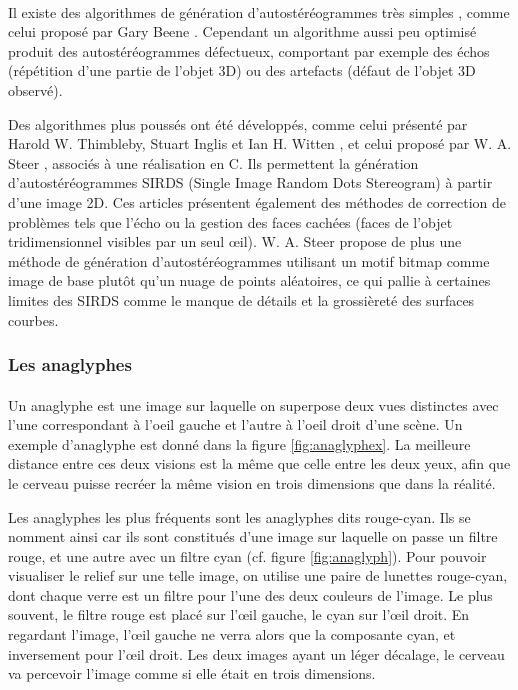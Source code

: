 \paragraph{}
Il existe des algorithmes de génération d’autostéréogrammes très simples , comme celui proposé par Gary Beene \cite{garybeene}. Cependant un algorithme aussi peu optimisé produit des autostéréogrammes défectueux, comportant par exemple des échos (répétition d'une partie de l'objet 3D) ou des artefacts (défaut de l'objet 3D observé).

Des algorithmes plus poussés ont été développés, comme celui présenté par Harold W. Thimbleby, Stuart Inglis et Ian H. Witten \cite{stereogram}, et celui proposé par W. A. Steer \cite{wasteer}, associés à une réalisation en C. Ils permettent la génération d’autostéréogrammes SIRDS (Single Image Random Dots Stereogram) à partir d’une image 2D. Ces articles présentent également des méthodes de correction de problèmes tels que l'écho ou la gestion des faces cachées (faces de l'objet tridimensionnel visibles par un seul œil). W. A. Steer propose de plus une méthode de génération d'autostéréogrammes utilisant un motif bitmap comme image de base plutôt qu'un nuage de points aléatoires, ce qui pallie à certaines limites des SIRDS comme le manque de détails et la grossièreté des surfaces courbes.

\subsubsection{Les anaglyphes}

\paragraph{}
	Un anaglyphe est une image sur laquelle on superpose deux vues distinctes avec l'une correspondant à l'oeil gauche et l'autre à l'oeil droit d’une scène. Un exemple d'anaglyphe est donné dans la figure \ref{fig:anaglyphex}. La meilleure distance entre ces deux visions est la même que celle entre les deux yeux, afin que le cerveau puisse recréer la même vision en trois dimensions que dans la réalité.

	Les anaglyphes les plus fréquents sont les anaglyphes dits rouge-cyan. Ils se nomment ainsi car ils sont constitués d’une image sur laquelle on passe un filtre rouge, et une autre avec un filtre cyan (cf. figure \ref{fig:anaglyph}). Pour pouvoir visualiser le relief sur une telle image, on utilise une paire de lunettes rouge-cyan, dont chaque verre est un filtre pour l’une des deux couleurs de l’image. Le plus souvent, le filtre rouge est placé sur l’œil gauche, le cyan sur l’œil droit. En regardant l’image, l’œil gauche ne verra alors que la composante cyan, et inversement pour l’œil droit. Les deux images ayant un léger décalage, le cerveau va percevoir l’image comme si elle était en trois dimensions. 
	
